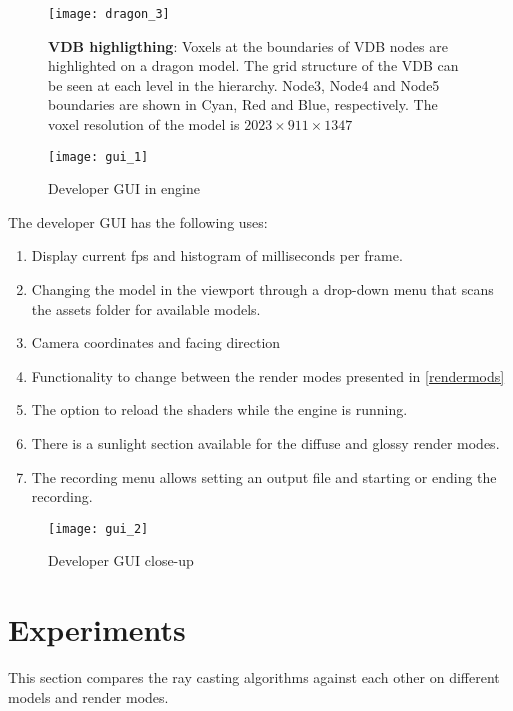 \begin{figure}[H]
  \centering
  \texttt{[image: dragon\_3]}
  \caption[Dragon model with VDB highlighted]{\textbf{VDB highligthing}: Voxels at the boundaries of VDB nodes are highlighted on a dragon model. The grid structure of the VDB can be seen at each level in the hierarchy. Node3, Node4 and Node5 boundaries are shown in Cyan, Red and Blue, respectively. The voxel resolution of the model is $2023\times911\times1347$}
\end{figure}

\begin{multicols}{2}[]
  \begin{figure}[H]
    \centering
    \texttt{[image: gui\_1]}
    \caption[Developer GUI]{Developer GUI in engine}
  \end{figure}
  The developer GUI has the following uses:
  \begin{enumerate}[itemstep=0mm]
    \item Display current \acrshort{fps} and histogram of milliseconds per frame.
    \item Changing the model in the viewport through a drop-down menu that scans the assets folder for available models.
    \item Camera coordinates and facing direction
    \item Functionality to change between the render modes presented in \cref{rendermods}
    \item The option to reload the shaders while the engine is running.
    \item There is a sunlight section available for the diffuse and glossy render modes.
    \item The recording menu allows setting an output file and starting or ending the recording.
  \end{enumerate}
  \columnbreak
  \begin{figure}[H]
    \centering
    \texttt{[image: gui\_2]}
    \caption{Developer GUI close-up}
    \label{gui}
  \end{figure}
\end{multicols}

\section{Experiments}
This section compares the ray casting algorithms against each other on different models and render modes.

